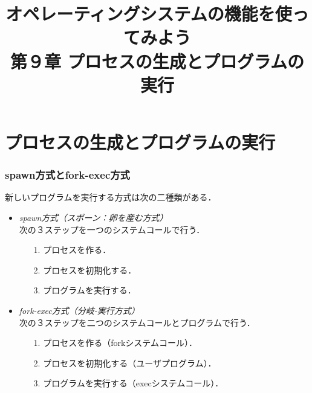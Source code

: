 \documentclass{beamer}                 %
\begin{document}
\title{オペレーティングシステムの機能を使ってみよう\\
第９章 プロセスの生成とプログラムの実行}
\date{}

\begin{frame}
  \titlepage
\end{frame}

\section{プロセスの生成とプログラムの実行}
\begin{frame}[fragile]
  \frametitle{spawn方式とfork-exec方式}
  新しいプログラムを実行する方式は次の二種類がある．
  \vfill
  \begin{itemize}
  \item \emph{spawn方式（スポーン：卵を産む方式）} \\
    次の３ステップを一つのシステムコールで行う．
    \begin{enumerate}
    \item[1.] プロセスを作る．
    \item[2.] プロセスを初期化する．
    \item[3.] プログラムを実行する．
    \end{enumerate}
  \vfill
  \item \emph{fork-exec方式（分岐-実行方式）} \\
    次の３ステップを二つのシステムコールとプログラムで行う．
    \begin{enumerate}
    \item[1.] プロセスを作る（forkシステムコール）．
    \item[2.] プロセスを初期化する（ユーザプログラム）．
    \item[3.] プログラムを実行する（execシステムコール）．
    \end{enumerate}
  \end{itemize}
  \vfill
\end{frame}
\end{document}
